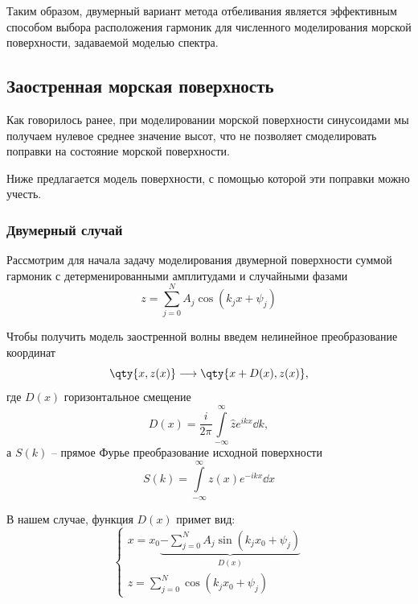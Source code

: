 Таким образом, двумерный вариант метода отбеливания является эффективным
способом выбора расположения гармоник для численного моделирования морской
поверхности, задаваемой моделью спектра.




\subsection{Заостренная морская поверхность}
Как говорилось ранее, при моделировании морской поверхности синусоидами мы
получаем нулевое среднее значение высот, что не позволяет смоделировать
поправки на состояние морской поверхности. 

Ниже предлагается модель поверхности, с помощью которой эти поправки можно
учесть.


\subsubsection{Двумерный случай}%
\label{ssub:odnomernyi_sluchai}

Рассмотрим для начала задачу моделирования двумерной поверхности суммой гармоник с детерменированными амплитудами и случайными фазами
 \begin{equation}
     z = \sum\limits_{j=0}^{N} A_j \cos(k_j x + \psi_j)
 \end{equation}

Чтобы получить модель заостренной волны введем нелинейное преобразование координат
\begin{equation}
    \qty{x,z(x)} \longrightarrow \qty{x + D(x),z(x)},
\end{equation}
где $D(x)$ горизонтальное смещение
\begin{equation}
    D(x) =  \frac{i}{2\pi} \int\limits_{-\infty}^{\infty}   \hat z e^{ikx} \dd{k},
\end{equation}
а $S(k)$ -- прямое Фурье преобразование исходной поверхности
\begin{equation}
    S(k) = \int\limits_{-\infty}^{\infty} z(x) e^{-ikx} \dd x 
\end{equation}

В нашем случае, функция $D(x)$ примет вид: 
\begin{equation}
    \begin{cases}
    x = x_{0} \underbrace{
    - \sum\limits_{j=0}^{N} A_j \sin(k_j x_0 + \psi_j)
    }_{D(x)} \\
        z = \sum\limits_{j=0}^{N} \cos(k_j x_{0} + \psi_j)
    \end{cases}
\end{equation}

